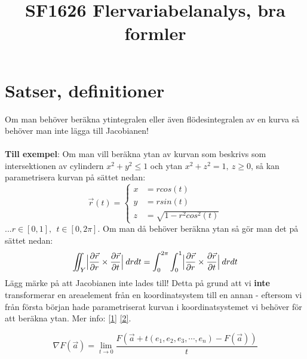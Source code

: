 \documentclass{report}
\title{\Huge{SF1626 Flervariabelanalys, bra formler}}
\author{\huge{}}
\date{}
\begin{document}
\maketitle
\newpage
\pagebreak

\chapter{Satser, definitioner}
{
	Om man behöver beräkna ytintegralen eller även flödesintegralen av en kurva så behöver man inte lägga till Jacobianen!\\\\
	
	\textbf{Till exempel}: Om man vill beräkna ytan av kurvan som beskrivs som intersektionen av cylindern $ x^2+y^2 \le 1$ och ytan $x^2+z^2 = 1, \: z \ge 0$, så kan parametrisera kurvan på sättet nedan:
	\begin{equation*}
	\vec{r}(t) =
	\begin{cases}
		x &= rcos(t)\\
		y &= rsin(t)\\
		z &= \sqrt{1-r^2cos^2(t)}
	\end{cases}
	\end{equation*}
	...$r \in [0,1], \:\: t \in [0, 2\pi]$. Om man då behöver beräkna ytan så gör man det på sättet nedan:
	\begin{equation*}
		\iint_Y \Bigl| \frac{\partial \vec{r}}{\partial r} \times \frac{\partial \vec{r}}{\partial t} \Bigr| \: drdt = \int_0^{2\pi}\int_0^1 \Bigl| \frac{\partial \vec{r}}{\partial r} \times \frac{\partial \vec{r}}{\partial t} \Bigr| \: drdt
	\end{equation*}
	Lägg märke på att Jacobianen inte lades till! Detta på grund att vi \textbf{inte} transformerar en areaelement från en koordinatsystem till en annan - eftersom vi från första början hade parametriserat kurvan i koordinatsystemet vi behöver för att beräkna ytan. Mer info: \href{https://math.stackexchange.com/questions/2388245/why-is-there-no-jacobian-in-the-definition-of-the-surface-integral-iint-ufds}{[1]} \href{https://math.stackexchange.com/a/2332951}{[2]}. 
}

{
	\begin{equation*}
		\nabla F( \vec{a} ) = \lim_{t \to 0} \frac{ F(\vec{a} + t(e_1, e_2, e_3, \cdots, e_n) - F(\vec{a})) }{t}
	\end{equation*}
}
\end{document}

